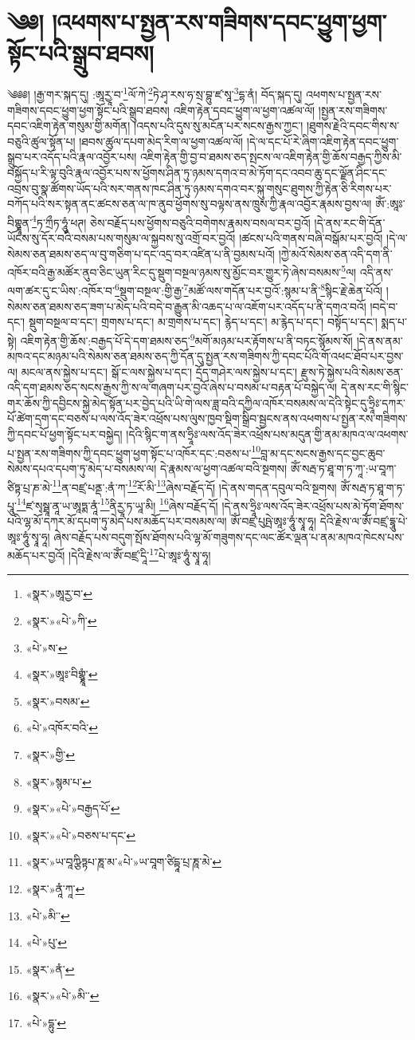 \chapter{༄༅། །འཕགས་པ་སྤྱན་རས་གཟིགས་དབང་ཕྱུག་ཕྱག་སྟོང་པའི་སྒྲུབ་ཐབས།}༄༅༅། །རྒྱ་གར་སྐད་དུ། :ཨཱརྱཱ་བ་\footnote{«སྣར་»ཨཱརྱ་བ་}ལོ་ཀེ་\footnote{«སྣར་»«པེ་»ཀི་}ཏེ་ཤྭ་རས་ཧ་སྲ་བྷུ་ཛ་སཱ་\footnote{«པེ་»ས་}དྷ་ནཾ། བོད་སྐད་དུ། འཕགས་པ་སྤྱན་རས་གཟིགས་དབང་ཕྱུག་ཕྱག་སྟོང་པའི་སྒྲུབ་ཐབས། འཇིག་རྟེན་དབང་ཕྱུག་ལ་ཕྱག་འཚལ་ལོ། །སྤྱན་རས་གཟིགས་དབང་འཇིག་རྟེན་གསུམ་གྱི་མགོན། །འདས་པའི་དུས་སུ་མངོན་པར་སངས་རྒྱས་ཀྱང་། །ཐུགས་རྗེའི་དབང་གིས་ས་བཅུའི་ཚུལ་སྟོན་པ། །ཐབས་ཚུལ་དཔག་མེད་རིག་ལ་ཕྱག་འཚལ་ལོ། །དེ་ལ་དང་པོ་རེ་ཞིག་འཇིག་རྟེན་དབང་ཕྱུག་སྒྲུབ་པར་འདོད་པའི་རྣལ་འབྱོར་པས། འཇིག་རྟེན་གྱི་བྱ་བ་ཐམས་ཅད་སྤངས་ལ་འཇིག་རྟེན་གྱི་ཆོས་བརྒྱད་ཀྱིས་མི་བསྐྱོད་པ་རི་ལྟ་བུའི་རྣལ་འབྱོར་པས་ས་ཕྱོགས་ཤིན་ཏུ་ཉམས་དགའ་བ་མེ་ཏོག་དང་འབབ་ཆུ་དང་ལྗོན་ཤིང་དང་འབྲས་བུ་སྣ་ཚོགས་ཡོད་པའི་སར་གནས་ཁང་ཤིན་ཏུ་ཉམས་དགའ་བར་སྐུ་གསུང་ཐུགས་ཀྱི་རྟེན་ཅི་རིགས་པར་བཀོད་པའི་སར་སྟན་ནང་ཚངས་ཅན་ལ་ཁ་ནུབ་ཕྱོགས་སུ་བལྟས་ནས་ཁྲུས་ཀྱི་རྣལ་འབྱོར་རྣམས་བྱས་ལ། ཨོཾ་:ཨཱཿ་བིགྷྣཱན་\footnote{«སྣར་»ཨཱཿ་བིགྷྣཱཾ་}ཏ་ཀྲྀཏ་ཧཱུཾ་ཕཊ། ཅེས་བརྗོད་པས་ཕྱོགས་བཅུའི་བགེགས་རྣམས་བསལ་བར་བྱའོ། །དེ་ནས་རང་གི་དོན་ཡོངས་སུ་དོར་བའི་བསམ་པས་གསུམ་ལ་སྐྱབས་སུ་འགྲོ་བར་བྱའོ། །ཚངས་པའི་གནས་བཞི་བསྒོམ་པར་བྱའོ། །དེ་ལ་སེམས་ཅན་ཐམས་ཅད་ལ་བུ་གཅིག་པ་དང་འདྲ་བར་འཛིན་པ་ནི་བྱམས་པའོ། །ཀྱེ་མའོ་སེམས་ཅན་འདི་དག་ནི་འཁོར་བའི་རྒྱ་མཚོར་ནུབ་ཅིང་ཡུན་རིང་དུ་སྡུག་བསྔལ་ཉམས་སུ་མྱོང་བར་གྱུར་ཏེ་ཞེས་བསམས་\footnote{«སྣར་»བསམ་}ལ། འདི་ནས་ལག་ཚར་དུ་ང་ཡིས་:འཁོར་བ་\footnote{«པེ་»འཁོར་བའི་}སྡུག་བསྔལ་:གྱི་རྒྱ་\footnote{«སྣར་»གྱི་}མཚོ་ལས་གདོན་པར་བྱའོ་:སྙམ་པ་ནི་\footnote{«སྣར་»སྙམ་པ་}སྙིང་རྗེ་ཆེན་པོའོ། །སེམས་ཅན་ཐམས་ཅད་ཟག་པ་མེད་པའི་བདེ་བ་རྒྱུན་མི་འཆད་པ་ལ་འཇོག་པར་འདོད་པ་ནི་དགའ་བའོ། །བདེ་བ་དང་། སྡུག་བསྔལ་བ་དང་། གྲགས་པ་དང་། མ་གྲགས་པ་དང་། རྙེད་པ་དང་། མ་རྙེད་པ་དང་། བསྟོད་པ་དང་། སྨད་པ་སྟེ། འཇིག་རྟེན་གྱི་ཆོས་:བརྒྱད་པོ་དེ་དག་ཐམས་ཅད་\footnote{«སྣར་»«པེ་»བརྒྱད་པོ་}མགོ་མཉམ་པར་རྟོགས་པ་ནི་བཏང་སྙོམས་སོ། །དེ་ནས་ནམ་མཁའ་དང་མཉམ་པའི་སེམས་ཅན་ཐམས་ཅད་ཀྱི་དོན་དུ་སྤྱན་རས་གཟིགས་ཀྱི་དབང་པོའི་གོ་འཕང་ཐོབ་པར་བྱས་ལ། མངལ་ནས་སྐྱེས་པ་དང་། སྒོ་ང་ལས་སྐྱེས་པ་དང་། དྲོད་གཤེར་ལས་སྐྱེས་པ་དང་། རྫུས་ཏེ་སྐྱེས་པའི་སེམས་ཅན་འདི་དག་ཐམས་ཅད་སངས་རྒྱས་ཀྱི་ས་ལ་གཞག་པར་བྱའོ་ཞེས་པ་བསམ་པ་བརྟན་པོ་བསྐྱེད་ལ། དེ་ནས་རང་གི་སྙིང་གར་ཆོས་ཀྱི་དབྱིངས་སྐྱེ་མེད་སྟོན་པར་བྱེད་པའི་ཡི་གེ་ལས་ཟླ་བའི་དཀྱིལ་འཁོར་བསམས་ལ་དེའི་སྟེང་དུ་ཧྲཱིཿ་དཀར་པོ་ཚེག་དྲག་དང་བཅས་པ་ལས་འོད་ཟེར་འཕྲོས་པས་ལུས་ཁྱབ་སྡིག་སྒྲིབ་སྦྱངས་ནས་འཕགས་པ་སྤྱན་རས་གཟིགས་ཀྱི་དབང་པོ་ཕྱག་སྟོང་པར་བསྐྱེད། །དེའི་སྙིང་ག་ནས་ཧྲཱིཿ་ལས་འོད་ཟེར་འཕྲོས་པས་མདུན་གྱི་ནམ་མཁའ་ལ་འཕགས་པ་སྤྱན་རས་གཟིགས་ཀྱི་དབང་ཕྱུག་ཕྱག་སྟོང་པ་འཁོར་དང་:བཅས་པ་\footnote{«སྣར་»«པེ་»བཅས་པ་དང་}བླ་མ་དང་སངས་རྒྱས་དང་བྱང་ཆུབ་སེམས་དཔའ་དཔག་ཏུ་མེད་པ་བསམས་ལ། དེ་རྣམས་ལ་ཕྱག་འཚལ་བའི་སྔགས། ཨོཾ་སརྦ་ཏ་ཐཱ་ག་ཏ་ཀཱ་:ཡ་བཱཀ་ཙིཏྟ་པྲ་ཎ་མེ་\footnote{«སྣར་»ཡ་བཱཀྩིཏྟཔ་ཎཱ་མ་«པེ་»ཡ་བཱག་ཙིདྟཱ་པྲ་ཎཱ་མེ་}ན་བཛྲ་པནྡ་:ནཾ་ཀ་\footnote{«སྣར་»ནཱཾ་ཀཱ་}རོ་མི་\footnote{«པེ་»མི་་}ཞེས་བརྗོད་དོ། །དེ་ནས་གདན་དབུལ་བའི་སྔགས། ཨོཾ་སརྦ་ཏ་ཐཱ་ག་ཏ་པཱུ་\footnote{«པེ་»པུ་}ཛ་སྭསྠཱ་ནཱ་ཡ་ཨཱཏྨ་ནཱཾ་\footnote{«སྣར་»ནཾ་}ནིརྱཱ་ཏ་ཡཱ་མི། \footnote{«སྣར་»«པེ་»མི་་}ཞེས་བརྗོད་དོ། །དེ་ནས་ཧྲཱིཿ་ལས་འོད་ཟེར་འཕྲོས་པས་མེ་ཏོག་ཐོགས་པའི་ལྷ་མོ་དཀར་མོ་དཔག་ཏུ་མེད་པས་མཆོད་པར་བསམས་ལ། ཨོཾ་བཛྲ་པུཥྤེ་ཨཱཿ་ཧཱུཾ་སྭཱ་ཧཱ། དེའི་རྗེས་ལ་ཨོཾ་བཛྲ་དྷཱུ་པེ་ཨཱཿ་ཧཱུཾ་སྭཱ་ཧཱ། ཞེས་བརྗོད་པས་བདུག་སྤོས་ཐོགས་པའི་ལྷ་མོ་གཟུགས་དང་ལང་ཚོར་ལྡན་པ་ནམ་མཁའ་ཁེངས་པས་མཆོད་པར་བྱའོ། །དེའི་རྗེས་ལ་ཨོཾ་བཛྲ་དཱི་\footnote{«པེ་»དྷུ་}པེ་ཨཱཿ་ཧཱུཾ་སྭཱ་ཧཱ། 
